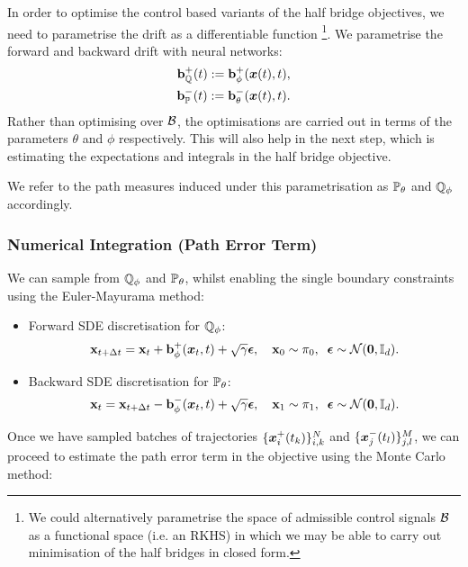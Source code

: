 \documentclass[a4paper,12pt,twoside,openright]{report}
\theoremstyle{definition}
\begin{document}
In order to optimise the control based variants of the half bridge objectives, we need to parametrise the drift as a differentiable function \footnote{We could alternatively parametrise the space of admissible control signals $\calB$ as a functional space (i.e. an  RKHS) in which we may be able to carry out minimisation of the half bridges in closed form.}. We parametrise the forward and backward drift with neural networks:
\begin{align} \label{eq:drift_param}
    \rvb^{+}_{\Q}(t) := \rvb^{+}_{\phi}(\vx(t), t), \nonumber \\
    \rvb^{-}_{\P}(t) := \rvb^{-}_{\theta}(\vx(t), t).
\end{align}
Rather than optimising over $\calB$, the optimisations are carried out in terms of the parameters $\theta$ and $\phi$ respectively. This will also help in the next step, which is estimating the expectations and integrals in the half bridge objective.

We refer to the path measures induced under this parametrisation as $\P_{\theta}$ and $\Q_{\phi}$ accordingly.

\subsubsection{Numerical Integration (Path Error Term)}
We can sample from $\Q_{\phi}$ and $\P_{\theta}$, whilst enabling the single boundary constraints using the Euler-Mayurama method:
\begin{itemize}
    \item  Forward SDE discretisation for $\Q_{\phi}$:
\begin{align*}
    \rvx_{t + \Delta t} = \rvx_t + \rvb^{+}_{\phi}(\vx_t, t) + \sqrt{\gamma} \rvepsilon, \quad \rvx_0 \sim \pi_0, \;\;\rvepsilon \sim \calN(\vzero, \I) .
\end{align*}
    \item  Backward SDE discretisation for $\P_{\theta}$:
\begin{align*}
    \rvx_{t} = \rvx_{t+\Delta t} - \rvb^{-}_{\phi}(\vx_t, t) + \sqrt{\gamma} \rvepsilon, \quad \rvx_1 \sim \pi_1,\;\; \rvepsilon \sim \calN(\vzero, \I).
\end{align*}
\end{itemize}

Once we have sampled batches of trajectories $\{\vx^{+}_i(t_k)\}_{i,k}^N$ and $\{\vx^{-}_j(t_l)\}_{j,l}^M$, we can proceed to estimate the path error term in the objective using the Monte Carlo  method:
\end{document}
